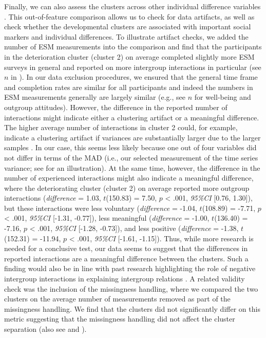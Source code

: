 Finally, we can also assess the clusters across other individual
difference variables \citep[e.g.,][]{monden2022}. This out-of-feature
comparison allows us to check for data artifacts, as well as check
whether the developmental clusters are associated with important social
markers and individual differences. To illustrate artifact checks, we
added the number of ESM measurements into the comparison and find that
the participants in the deterioration cluster (cluster 2) on average
completed slightly more ESM surveys in general and reported on more
intergroup interactions in particular (see \(n\) in
). In our data exclusion procedures, we
ensured that the general time frame and completion rates are similar for
all participants and indeed the numbers in ESM measurements generally
are largely similar (e.g., see \(n\) for well-being and outgroup
attitudes). However, the difference in the reported number of
interactions might indicate either a clustering artifact or a meaningful
difference. The higher average number of interactions in cluster 2
could, for example, indicate a clustering artifact if variances are
substantially larger due to the larger samples
\citep[e.g., restriction of range in the smaller sample][]{kogan2006}.
In our case, this seems less likely because one out of four variables
did not differ in terms of the MAD (i.e., our selected measurement of
the time series variance; see 
for an illustration). At the same time, however, the difference in the
number of experienced interactions might also indicate a meaningful
difference, where the deteriorating cluster (cluster 2) on average
reported more outgroup interactions (\textit{difference} = 1.03,
\(t\)(150.83) = 7.50, \(p\) \textless{} .001, \textit{95\%CI} {[}0.76,
1.30{]}), but these interactions were less voluntary
(\textit{difference} = -1.04, \(t\)(108.89) = -7.71, \(p\) \textless{}
.001, \textit{95\%CI} {[}-1.31, -0.77{]}), less meaningful
(\textit{difference} = -1.00, \(t\)(136.40) = -7.16, \(p\) \textless{}
.001, \textit{95\%CI} {[}-1.28, -0.73{]}), and less positive
(\textit{difference} = -1.38, \(t\)(152.31) = -11.94, \(p\) \textless{}
.001, \textit{95\%CI} {[}-1.61, -1.15{]}). Thus, while more research is
needed for a conclusive test, our data seems to suggest that the
differences in reported interactions are a meaningful difference between
the clusters. Such a finding would also be in line with past research
highlighting the role of negative intergroup interactions in explaining
intergroup relations \citep[e.g.,][]{Barlow2012, Prati2021, Graf2014}. A
related validity check was the inclusion of the missingness handling,
where we compared the two clusters on the average number of measurements
removed as part of the missingness handling. We find that the clusters
did not significantly differ on this metric suggesting that the
missingness handling did not affect the cluster separation (also see
 and \situtorial).

